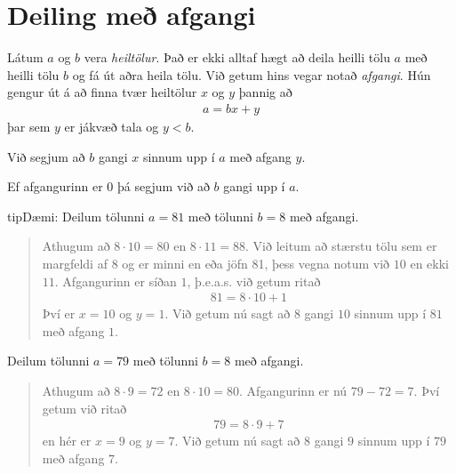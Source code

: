 \documentclass[a4paper,10pt,icelandic]{sphinxmanual}
\begin{document}
\section{Deiling með afgangi}
\label{\detokenize{Kafli01:deiling-me-afgangi}}
Látum \(a\) og \(b\) vera \textit{heiltölur}.
Það er ekki alltaf hægt að deila heilli tölu \(a\) með heilli tölu \(b\) og fá út aðra heila tölu.
Við getum hins vegar notað  \textit{afgangi}.
Hún gengur út á að finna tvær heiltölur \(x\) og \(y\) þannig að
\begin{equation*}
\begin{split}a=bx+y\end{split}
\end{equation*}
þar sem \(y\) er jákvæð tala og \(y<b\).

Við segjum að \(b\) gangi \(x\) sinnum upp í \(a\) með afgang \(y\).

Ef afgangurinn er \(0\) þá segjum við að \(b\) gangi upp í \(a\).

\begin{sphinxadmonition}{tip}{Dæmi:}
 Deilum tölunni \(a=81\) með tölunni \(b=8\) með afgangi.
\begin{quote}

Athugum að \(8 \cdot 10=80\) en \(8 \cdot 11=88\). Við leitum að stærstu tölu sem er margfeldi af \(8\) og er minni en eða jöfn 81, þess vegna notum við \(10\) en ekki \(11\). Afgangurinn er síðan \(1\), þ.e.a.s. við getum ritað
\begin{equation*}
\begin{split}81=8 \cdot 10 + 1\end{split}
\end{equation*}
Því er \(x=10\) og \(y=1\). Við getum nú sagt að \(8\) gangi \(10\) sinnum upp í \(81\) með afgang \(1\).
\end{quote}

 Deilum tölunni \(a=79\) með tölunni \(b=8\) með afgangi.
\begin{quote}

Athugum að \(8 \cdot 9=72\) en \(8 \cdot 10=80\). Afgangurinn er nú \(79-72=7\). Því getum við ritað
\begin{equation*}
\begin{split}79=8 \cdot 9 + 7\end{split}
\end{equation*}
en hér er \(x=9\) og \(y=7\). Við getum nú sagt að \(8\) gangi \(9\) sinnum upp í \(79\) með afgang \(7\).
\end{quote}
\end{sphinxadmonition}
\end{document}
